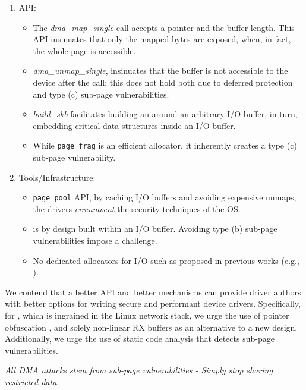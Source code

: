 \begin{enumerate}
    \item API: 
    \begin{itemize}
        \item The \textit{dma\_map\_single} call accepts a pointer and the buffer length. This API insinuates that only the mapped bytes are exposed, when, in fact, the whole page is accessible.
        \item \textit{dma\_unmap\_single}, insinuates that the buffer is not accessible to the device after the call; this does not hold both due to deferred protection and type (c) sub-page vulnerabilities.
        \item \textit{build\_skb} facilitates building an \skb{} around an arbitrary I/O buffer, in turn, embedding critical data structures inside an I/O buffer.
        \item While \texttt{page\_frag} is an efficient allocator, it inherently creates a type (c) sub-page vulnerability.
    \end{itemize} 
    \item Tools/Infrastructure: 
    \begin{itemize}
            \item \texttt{page\_pool} API, by caching I/O buffers and avoiding expensive unmaps, the drivers \emph{circumvent} the security techniques of the OS. 
            \item \shinfo{} is by design built within an I/O buffer. Avoiding type (b) sub-page vulnerabilities impose a challenge.
            \item No dedicated allocators for I/O such as proposed in previous works (e.g., \cite{MSMT18,MMT16}).
    \end{itemize}
\end{enumerate}

We contend that a better API and better mechanisms can provide driver authors with better options for writing secure and performant device drivers. Specifically, for \shinfo{}, which is ingrained in the Linux network stack, we urge the use of pointer obfuscation \cite{Coo17}, and solely non-linear RX buffers as an alternative to a new design. Additionally, we urge the use of static code analysis that detects sub-page vulnerabilities.

\emph{All DMA attacks stem from sub-page vulnerabilities - Simply stop sharing restricted data.}
